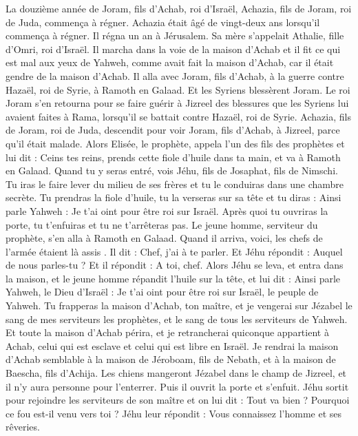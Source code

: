 \begin{multicols}{2}
La douzième année de Joram, fils d'Achab, roi d'Israël, Achazia, fils de Joram, roi de Juda, commença à régner.
Achazia était âgé de vingt-deux ans lorsqu'il commença à régner. Il régna un an à Jérusalem. Sa mère s'appelait Athalie, fille d'Omri, roi d'Israël.
Il marcha dans la voie de la maison d'Achab et il fit ce qui est mal aux yeux de Yahweh, comme avait fait la maison d'Achab, car il était gendre de la maison d'Achab.
Il alla avec Joram, fils d'Achab, à la guerre contre Hazaël, roi de Syrie, à Ramoth en Galaad. Et les Syriens blessèrent Joram.
Le roi Joram s'en retourna pour se faire guérir à Jizreel des blessures que les Syriens lui avaient faites à Rama, lorsqu'il se battait contre Hazaël, roi de Syrie. Achazia, fils de Joram, roi de Juda, descendit pour voir Joram, fils d'Achab, à Jizreel, parce qu'il était malade.
\VerseOne{}Alors Elisée, le prophète, appela l'un des fils des prophètes et lui dit : Ceins tes reins, prends cette fiole d'huile dans ta main, et va à Ramoth en Galaad.
Quand tu y seras entré, vois Jéhu, fils de Josaphat, fils de Nimschi. Tu iras le faire lever du milieu de ses frères et tu le conduiras dans une chambre secrète.
Tu prendras la fiole d'huile, tu la verseras sur sa tête et tu diras : Ainsi parle Yahweh : Je t'ai oint pour être roi sur Israël. Après quoi tu ouvriras la porte, tu t'enfuiras et tu ne t'arrêteras pas.
Le jeune homme, serviteur du prophète, s'en alla à Ramoth en Galaad.
Quand il arriva, voici, les chefs de l'armée étaient  là assis . Il dit : Chef, j'ai à te parler. Et Jéhu répondit : Auquel de nous parles-tu ? Et il répondit : A toi, chef.
Alors Jéhu se leva, et entra dans la maison, et le jeune homme répandit l'huile sur la tête, et lui dit : Ainsi parle Yahweh, le Dieu d'Israël : Je t'ai oint pour être roi sur Israël, le peuple de Yahweh.
Tu frapperas la maison d'Achab, ton maître, et je vengerai sur Jézabel le sang de mes serviteurs les prophètes, et le sang de tous les serviteurs de Yahweh.
Et toute la maison d'Achab périra, et je retrancherai quiconque appartient à Achab, celui qui est esclave et celui qui est libre en Israël.
Je rendrai la maison d'Achab semblable à la maison de Jéroboam, fils de Nebath, et à la maison de Baescha, fils d'Achija.
Les chiens mangeront Jézabel dans le champ de Jizreel, et il n'y aura personne pour l'enterrer. Puis il ouvrit la porte et s'enfuit.
Jéhu sortit pour rejoindre les serviteurs de son maître et on lui dit : Tout va bien ? Pourquoi ce fou est-il venu vers toi ? Jéhu leur répondit : Vous connaissez l'homme et ses rêveries.

\end{multicols}
